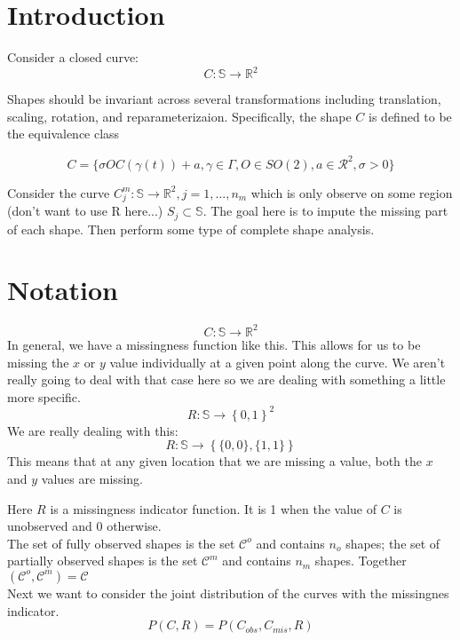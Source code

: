 \documentclass{article}\usepackage[]{graphicx}\usepackage[]{color}
\begin{document}
\section{Introduction}
Consider a closed curve: 
$$
C: \mathbb{S} \rightarrow \mathbb{R}^2 
$$

Shapes should be invariant across several transformations including translation, scaling, rotation, and reparameterizaion.  Specifically, the shape $C$ is defined to be the equivalence class

$$
C = \{\sigma O C(\gamma(t)) + a, \gamma \in \Gamma, O \in SO(2), a\in \mathcal{R}^2, \sigma > 0\} 
$$

Consider the curve $C_j^m: \mathbb{S} \rightarrow \mathbb{R}^2, j = 1, \dots, n_m$ which is only observe on some region (don't want to use R here...) $S_j \subset \mathbb{S}$.  The goal here is to impute the missing part of each shape.  Then perform some type of complete shape analysis.  




\section{Notation}
$$
C: \mathbb{S} \rightarrow \mathbb{R}^2 
$$
In general, we have a missingness function like this.  This allows for us to be missing the $x$ or $y$ value individually at a given point along the curve.  We aren't really going to deal with that case here so we are dealing with something a little more specific.  
$$
R: \mathbb{S} \rightarrow \left\{0,1\right\}^2
$$
We are really dealing with this:  
$$
R: \mathbb{S} \rightarrow \left\{\{0,0\},\{1,1\}\right\}
$$
This means that at any given location that we are missing a value, both the $x$ and $y$ values are missing.  



Here $R$ is a missingness indicator function.  It is 1 when the value of $C$ is unobserved and 0 otherwise. \\ 

The set of fully observed shapes is the set $\mathcal{C}^o$ and contains $n_o$ shapes; the set of partially observed shapes is the set $\mathcal{C}^m$ and contains $n_m$ shapes.  Together $(\mathcal{C}^o,\mathcal{C}^m) = \mathcal{C}$ \\


Next we want to consider the joint distribution of the curves with the missingnes indicator.  
$$
P(C, R) = P(C_{obs}, C_{mis}, R)
$$
\end{document}

